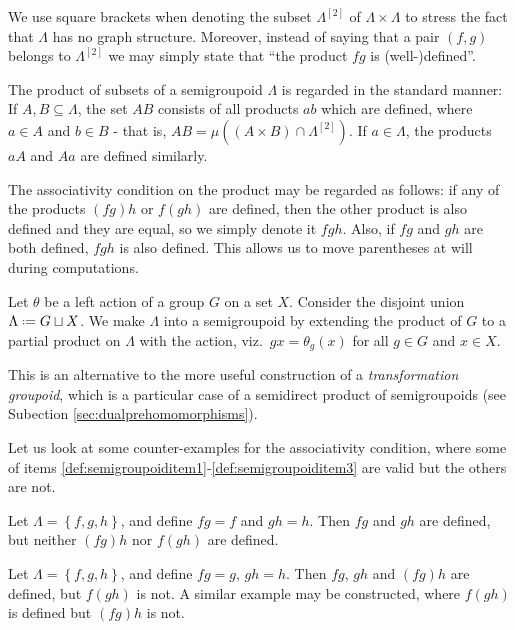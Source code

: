 We use square brackets when denoting the subset $\Lambda^{[2]}$ of $\Lambda\times\Lambda$ to stress the fact that $\Lambda$ has no graph structure. Moreover, instead of saying that a pair $(f,g)$ belongs to $\Lambda^{[2]}$ we may simply state that ``the product $fg$ is (well-)defined''.

The product of subsets of a semigroupoid $\Lambda$ is regarded in the standard manner: If $A,B\subseteq\Lambda$, the set $AB$ consists of all products $ab$ which are defined, where $a\in A$ and $b\in B$ - that is, $AB=\mu((A\times B)\cap\Lambda^{[2]})$. If $a\in\Lambda$, the products $aA$ and $Aa$ are defined similarly.

The associativity condition on the product may be regarded as follows: if any of the products $(fg)h$ or $f(gh)$ are defined, then the other product is also defined and they are equal, so we simply denote it $fgh$. Also, if $fg$ and $gh$ are both defined, $fgh$ is also defined. This allows us to move parentheses at will during computations.

\begin{example}
Let $\theta$ be a left action of a group $G$ on a set $X$. Consider the disjoint union $\Lambda\defeq G\sqcup X$. We make $\Lambda$ into a semigroupoid by extending the product of $G$ to a partial product on $\Lambda$ with the action, viz.\ $gx=\theta_g(x)$ for all $g\in G$ and $x\in X$.

This is an alternative to the more useful construction of a \emph{transformation groupoid}, which is a particular case of a semidirect product of semigroupoids (see Subection \ref{sec:dualprehomomorphisms}).
\end{example}

Let us look at some counter-examples for the associativity condition, where some of items \ref{def:semigroupoiditem1}-\ref{def:semigroupoiditem3} are valid but the others are not.

\begin{example}
Let $\Lambda=\left\{f,g,h\right\}$, and define $fg=f$ and $gh=h$. Then $fg$ and $gh$ are defined, but neither $(fg)h$ nor $f(gh)$ are defined.
\end{example}

\begin{example}
Let $\Lambda=\left\{f,g,h\right\}$, and define $fg=g$, $gh=h$. Then $fg$, $gh$ and $(fg)h$ are defined, but $f(gh)$ is not. A similar example may be constructed, where $f(gh)$ is defined but $(fg)h$ is not.
\end{example}

